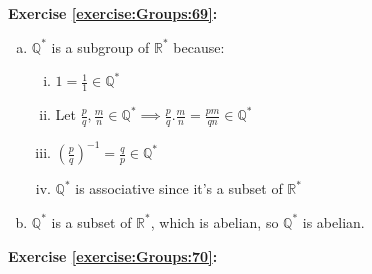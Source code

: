 \noindent\textbf{Exercise \ref{exercise:Groups:69}:}
%

\begin{enumerate}[(a)]
\item
${\mathbb Q}^*$ is a subgroup of ${\mathbb R}^*$ because:
	\begin{enumerate}[(i)]
	\item
	$1=\displaystyle\frac{1}{1}\in {\mathbb Q}^*$
	
	\item
	Let $\displaystyle\frac{p}{q},\frac{m}{n}\in {\mathbb Q}^*\implies \frac{p}{q}.\frac{m}{n}=\frac{pm}{qn}\in {\mathbb Q}^*$
	
	\item
	$\left(\displaystyle\frac{p}{q}\right)^{-1}=\displaystyle{\frac{q}{p}}\in {\mathbb Q}^*$
	
	\item
	${\mathbb Q}^*$ is associative since it's a subset of ${\mathbb R}^*$
	\end{enumerate}
	
\item
${\mathbb Q}^*$ is a subset of ${\mathbb R}^*$, which is abelian, so ${\mathbb Q}^*$ is abelian.
\end{enumerate}

\noindent\textbf{Exercise \ref{exercise:Groups:70}:}

